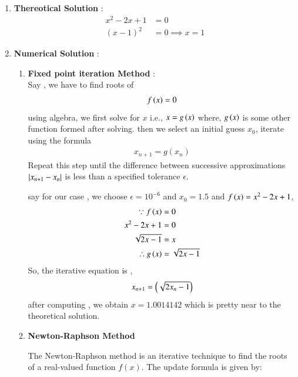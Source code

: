 \documentclass[journal]{IEEEtran}
\begin{document}
\begin{enumerate}
	\item \textbf{Thereotical Solution} : \\
		\begin{align}
			x^2 - 2x + 1 &= 0 \\ 
			(x-1)^2 &= 0 \implies x = 1 
		\end{align}
	\item \textbf{Numerical Solution} : \\
	
		\begin{enumerate}
			\item \textbf{Fixed point iteration Method} : \\
				Say , we have to find roots of 
					\begin{align}
						f\left(x\right)=0
					\end{align}
				using algebra, we first solve  for $x$ i.e., $x = g\left(x\right)$ where, $g\left(x\right)$ is some other function formed after solving.
				then we select an initial guess \( x_0 \), iterate using the formula 
					\begin{align}
						x_{n+1} = g(x_n)
					\end{align}
				Repeat this step until the difference between successive approximations $ \left\vert x_{n+1} - x_n\right\vert $ is less than a specified tolerance  $\epsilon$.

				\newpage

				say for our case , we choose $\epsilon = 10^{-6}$ and $x_0 = 1.5$ and $f\left(x\right) = x^2 -2x + 1 $,
					\begin{align}
						\because f\left(x\right) &= 0 \\
						x^2 - 2x + 1 &= 0 \\
						\sqrt{2x - 1} &= x \\
						\therefore g\left(x\right) &=  \sqrt{2x - 1} 
					\end{align}
				So, the iterative equation is ,
				\begin{align}
					x_{n+1} = \left(\sqrt{2x_n - 1} \right)	
				\end{align}
				after computing , we obtain $x = 1.0014142$ which is pretty near to the theoretical solution. \\

			\item \textbf{Newton-Raphson Method}
				
				The Newton-Raphson method is an iterative technique to find the roots of a real-valued function \( f(x) \). The update formula is given by:


\end{enumerate}
\end{enumerate}
\end{document}

